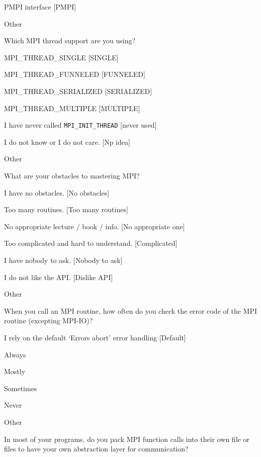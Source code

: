 \documentclass[preprint,5p,times]{elsarticle}
\begin{document}
{\begin{description}
\begin{inparaenum}[{\bf C}1)]
    \item PMPI interface [PMPI]
    \item Other
    \end{inparaenum}
  \item[Q18*:] Which MPI thread support are you using?
    \begin{inparaenum}[{\bf C}1)]
    \item MPI\_THREAD\_SINGLE [SINGLE]
    \item MPI\_THREAD\_FUNNELED [FUNNELED]
    \item MPI\_THREAD\_SERIALIZED [SERIALIZED]
    \item MPI\_THREAD\_MULTIPLE [MULTIPLE]
    \item I have never called {\tt MPI\_INIT\_THREAD} [never used]
    \item I do not know or I do not care. [Np idea]
    \item Other
    \end{inparaenum}
  \item[Q19*:] What are your obstacles to mastering MPI?
    \begin{inparaenum}[{\bf C}1)]
    \item I have no obstacles. [No obstacles]
    \item Too many routines. [Too many routines]
    \item No appropriate lecture / book / info. [No appropriate one]
    \item Too complicated and hard to understand. [Complicated]
    \item I have nobody to ask. [Nobody to ask]
    \item I do not like the API. [Dislike API]
    \item Other
    \end{inparaenum}
  \item[Q20:] When you call an MPI routine, how often do you check the error code of the MPI routine  (excepting MPI-IO)?
    \begin{inparaenum}[{\bf C}1)]
    \item I rely on the default ‘Errors abort’ error handling [Default]
    \item Always
    \item Mostly
    \item Sometimes
    \item Never
    \item Other
    \end{inparaenum}
  \item[Q21:] In most of your programs, do you pack MPI function calls into their own file or files to have your own abstraction layer for communication?

\end{description}}
\end{document}
